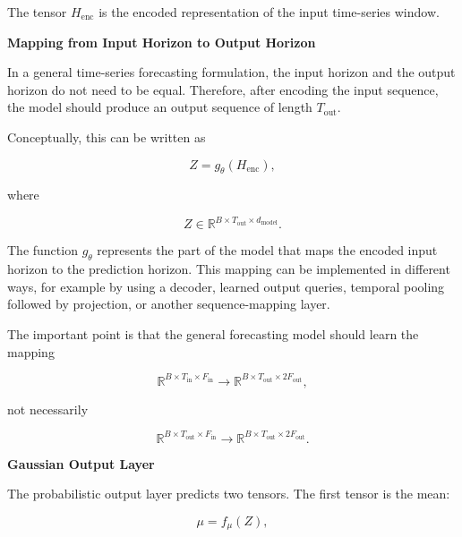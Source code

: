 \documentclass{book}
\providecommand{\ProjectDeepHeading}[2]{%
    \par\medskip\noindent\textbf{#2}\par\smallskip
}
\begin{document}
        The tensor \(H_{\mathrm{enc}}\) is the encoded representation of the input time-series window.
    
    
    \ProjectDeepHeading{8}{Mapping from Input Horizon to Output Horizon}
        
        In a general time-series forecasting formulation, the input horizon and the output horizon do not need to be equal. Therefore, after encoding the input sequence, the model should produce an output sequence of length \(T_{\mathrm{out}}\).
        
        Conceptually, this can be written as
        
        \[
            Z
            =
            g_{\ensuremath{\theta}}
            \left(
                H_{\mathrm{enc}}
            \right),
        \]
        
        where
        
        \[
            Z
            \in
            \mathbb{R}^{B \times T_{\mathrm{out}} \times d_{\mathrm{model}}}.
        \]
        
        The function \(g_{\ensuremath{\theta}}\) represents the part of the model that maps the encoded input horizon to the prediction horizon. This mapping can be implemented in different ways, for example by using a decoder, learned output queries, temporal pooling followed by projection, or another sequence-mapping layer.
        
        The important point is that the general forecasting model should learn the mapping
        
        \[
            \mathbb{R}^{B \times T_{\mathrm{in}} \times F_{\mathrm{in}}}
            \rightarrow
            \mathbb{R}^{B \times T_{\mathrm{out}} \times 2F_{\mathrm{out}}},
        \]
        
        not necessarily
        
        \[
            \mathbb{R}^{B \times T_{\mathrm{out}} \times F_{\mathrm{in}}}
            \rightarrow
            \mathbb{R}^{B \times T_{\mathrm{out}} \times 2F_{\mathrm{out}}}.
        \]
    
    
    \ProjectDeepHeading{8}{Gaussian Output Layer}
        
        The probabilistic output layer predicts two tensors. The first tensor is the mean:
        
        \[
            \ensuremath{\mu}
            =
            f_{\ensuremath{\mu}}
            \left(
                Z
            \right),
        \]
        
\end{document}
